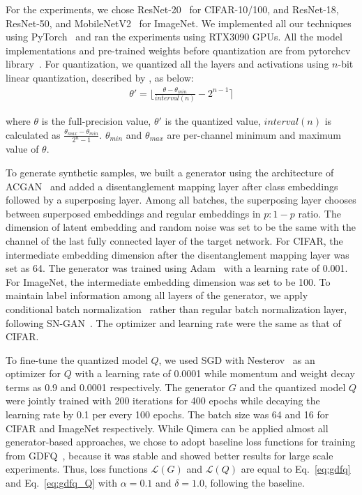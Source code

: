 \documentclass{article}
\newcommand{\aname}{Qimera\xspace}
\newcommand{\JL}[1]{{\color{magenta}[\textbf{\sc JLee}: \textit{#1}]}}
\newcommand{\KH}[1]{{\color{purple}[\textbf{\sc KH}: \textit{#1}]}}
\renewcommand{\JL}[1]{}
\renewcommand{\KH}[1]{}
\newcommand{\loss}{\mathcal{L}}
\begin{document}
For the experiments, we chose ResNet-20~\cite{resnet} for CIFAR-10/100, and ResNet-18, ResNet-50, and MobileNetV2~\cite{mobilenetv2} for ImageNet. 
We implemented all our techniques using PyTorch~\cite{pytorch} and ran the experiments using RTX3090 GPUs.
All the model implementations and pre-trained weights before quantization are from pytorchcv library~\cite{pytorchcv}. 
For quantization, we quantized all the layers and activations using $n$-bit linear quantization, described by \cite{jacob2018quantization}, as below:
\begin{align}
    \label{eq:quant}
    \theta' = 
        \bigg \lfloor\frac{\theta-\theta_{min}}{interval(n)}-2^{n-1} \bigg \rceil
\end{align}
\KH{Change notation to functional form}
where ${\theta}$ is the full-precision value, ${\theta'}$ is the quantized value, ${interval(n)}$ is calculated as ${\frac{\theta_{max}-\theta_{min}}{2^{n}-1}}$. 
${\theta_{min}}$ and ${\theta_{max}}$ are per-channel minimum and maximum value of ${\theta}$. \KH{function notation}
 

To generate synthetic samples, we built a generator using the architecture of ACGAN~\cite{acgan} and added a disentanglement mapping layer after class embeddings followed by a superposing layer. 
Among all batches, the superposing layer chooses between superposed embeddings and regular embeddings in ${p:1-p}$ ratio. 
The dimension of latent embedding and random noise was set to be the same with the channel of the last fully connected layer of the target network. 
For CIFAR, the intermediate embedding dimension after the disentanglement mapping layer was set as 64. 
The generator was trained using Adam~\cite{adam} with a learning rate of 0.001. 
For ImageNet, the intermediate embedding dimension was set to be 100. 
To maintain label information among all layers of the generator, we apply conditional batch normalization~\cite{CBN} rather than regular batch normalization layer, following SN-GAN~\cite{sngan}. 
The optimizer and learning rate were the same as that of CIFAR. 


\JL{need a space before citation brackets! usually a unbreakable space (\textasciitilde) is preferred.}
To fine-tune the quantized model ${Q}$, we used SGD with Nesterov~\cite{nesterov} as an optimizer for ${Q}$ with a learning rate of 0.0001 while momentum and weight decay terms as 0.9 and 0.0001 respectively. 
The generator $G$ and the quantized model ${Q}$ were jointly trained with 200 iterations for 400 epochs while decaying the learning rate by 0.1 per every 100 epochs. The batch size was 64 and 16 for CIFAR and ImageNet respectively. 
While \aname can be applied almost all generator-based approaches, we chose to adopt baseline loss functions for training from GDFQ~\cite{gdfq}, because it was stable and showed better results for large scale experiments.
Thus, loss functions $\loss(G)$ and $\loss(Q)$ are equal to Eq.~\ref{eq:gdfq} and Eq.~\ref{eq:gdfq_Q} with ${\alpha}=0.1$ and ${\delta=1.0}$, following the baseline.
\KH{Isn't it too similar with GDFQ?}\JL{I added `following the baseline'}
\JL{hyparm p and K?}
\end{document}
